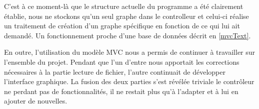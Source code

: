 C'est à ce moment-là que le structure actuelle du programme a été clairement établie, nous ne stockons qu'un seul graphe dans le controlleur et celui-ci réalise un traitement de création d'un graphe spécifique en fonction de ce qui lui ait demandé. Un fonctionnement proche d'une base de données décrit en \ref{mvcText}. 

En outre, l'utilisation du modèle MVC nous a permis de continuer à travailler sur l'ensemble du projet. Pendant que l'un d'entre nous apportait les corrections nécessaires à la partie lecture de fichier, l'autre continuait de développer l'interface graphique. La fusion des deux parties s'est révélée triviale le contrôleur ne perdant pas de fonctionnalités, il ne restait plus qu'à l'adapter et à lui en ajouter de nouvelles.
